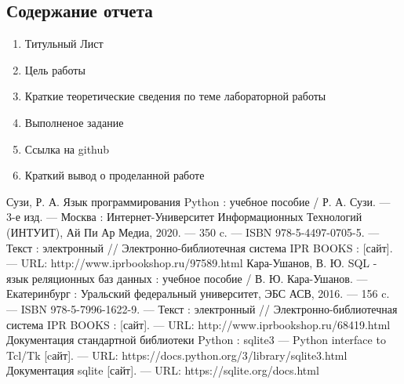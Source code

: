 \documentclass[a4paper]{article}
\begin{document}
\subsection{Содержание отчета}
\begin{enumerate}
  \item Титульный Лист
  \item Цель работы
  \item Краткие теоретические сведения по теме лабораторной работы
  \item Выполненое задание
  \item Ссылка на github
  \item Краткий вывод о проделанной работе
\end{enumerate}

\begin{thebibliography}{3}
  Сузи, Р. А. Язык программирования Python : учебное пособие / Р. А. Сузи. — 3-е изд. — Москва : Интернет-Университет Информационных Технологий (ИНТУИТ), Ай Пи Ар Медиа, 2020. — 350 c. — ISBN 978-5-4497-0705-5. — Текст : электронный // Электронно-библиотечная система IPR BOOKS : [сайт]. — URL: http://www.iprbookshop.ru/97589.html
  Кара-Ушанов, В. Ю. SQL - язык реляционных баз данных : учебное пособие / В. Ю. Кара-Ушанов. — Екатеринбург : Уральский федеральный университет, ЭБС АСВ, 2016. — 156 c. — ISBN 978-5-7996-1622-9. — Текст : электронный // Электронно-библиотечная система IPR BOOKS : [сайт]. — URL: http://www.iprbookshop.ru/68419.html 
   Документация стандартной библиотеки Python : sqlite3 — Python interface to Tcl/Tk [cайт]. --- URL: https://docs.python.org/3/library/sqlite3.html
   Документация sqlite [сайт]. --- URL: https://sqlite.org/docs.html
\end{thebibliography}
\end{document}
